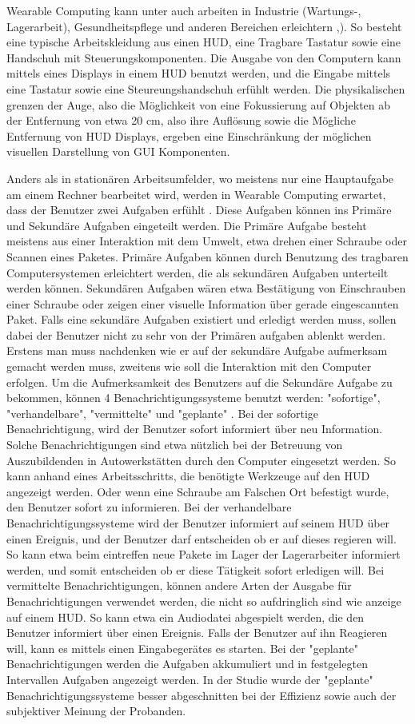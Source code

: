 Wearable Computing kann unter auch arbeiten in Industrie (Wartungs-, Lagerarbeit), Gesundheitspflege und anderen Bereichen erleichtern \cite{Witt:2006hi},\cite{Lawo:2008gg}). So besteht eine typische Arbeitskleidung aus einen HUD, eine Tragbare Tastatur sowie eine Handschuh mit Steuerungskomponenten. Die Ausgabe von den Computern kann mittels eines Displays in einem HUD benutzt werden, und die Eingabe mittels eine Tastatur sowie eine Steureungshandschuh erfühlt werden. Die physikalischen grenzen der Auge, also die Möglichkeit von eine Fokussierung auf Objekten ab der Entfernung von etwa 20 cm, also ihre Auflösung sowie die Mögliche Entfernung von HUD Displays, ergeben eine Einschränkung der möglichen visuellen Darstellung von GUI Komponenten. 

Anders als in stationären Arbeitsumfelder, wo meistens nur eine Hauptaufgabe am einem Rechner bearbeitet wird, werden in Wearable Computing erwartet, dass der Benutzer zwei Aufgaben erfühlt \cite{Witt:2006hi}. Diese Aufgaben können ins Primäre und Sekundäre Aufgaben eingeteilt werden. Die Primäre Aufgabe besteht meistens aus einer Interaktion mit dem Umwelt, etwa drehen einer Schraube oder Scannen eines Paketes. Primäre Aufgaben können durch Benutzung des tragbaren Computersystemen erleichtert werden, die als sekundären Aufgaben unterteilt werden können. Sekundären Aufgaben wären etwa Bestätigung von Einschrauben einer Schraube oder zeigen einer visuelle Information über gerade eingescannten Paket. Falls eine sekundäre Aufgaben existiert und erledigt werden muss, sollen dabei der Benutzer nicht zu sehr von der Primären aufgaben ablenkt werden. Erstens man muss nachdenken wie er auf der sekundäre Aufgabe aufmerksam gemacht werden muss, zweitens wie soll die Interaktion mit den Computer erfolgen. Um die Aufmerksamkeit des Benutzers auf die Sekundäre Aufgabe zu bekommen, können 4 Benachrichtigungssysteme benutzt werden: "sofortige", "verhandelbare", "vermittelte" und "geplante" \cite{McFarlane:1999um}\cite{Nilsson:cq}. Bei der sofortige Benachrichtigung, wird der Benutzer sofort informiert über neu Information. Solche Benachrichtigungen sind etwa nützlich bei der Betreuung von Auszubildenden in Autowerkstätten durch den Computer eingesetzt werden. So kann anhand eines Arbeitsschritts, die benötigte Werkzeuge auf den HUD angezeigt werden. Oder wenn eine Schraube am Falschen Ort befestigt wurde, den Benutzer sofort zu informieren. Bei der verhandelbare Benachrichtigungssysteme wird der Benutzer informiert auf seinem HUD über einen Ereignis, und der Benutzer darf entscheiden ob er auf dieses regieren will. So kann etwa beim eintreffen neue Pakete im Lager der Lagerarbeiter informiert werden, und somit entscheiden ob er diese Tätigkeit sofort erledigen will. Bei vermittelte Benachrichtigungen, können andere Arten der Ausgabe für Benachrichtigungen verwendet werden, die nicht so aufdringlich sind wie anzeige auf einem HUD. So kann etwa ein Audiodatei abgespielt werden, die den Benutzer informiert über einen Ereignis. Falls der Benutzer auf ihn Reagieren will, kann es mittels einen Eingabegerätes es starten. Bei der "geplante" Benachrichtigungen werden die Aufgaben  akkumuliert und in festgelegten Intervallen Aufgaben angezeigt werden. In der Studie \cite{Nilsson:cq} wurde der "geplante" Benachrichtigungssysteme besser abgeschnitten bei der Effizienz sowie auch der subjektiver Meinung der Probanden.
